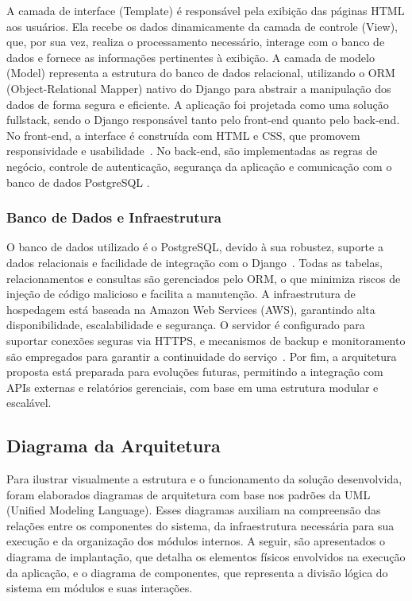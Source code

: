 \documentclass[
	12pt,				%
	openany,			%
	oneside,			%
	a4paper,			%
	english,			%
	french,				%
	spanish,			%
	brazil				%
	]{abntex2}
\begin{document}
A camada de interface (Template) é responsável pela exibição das páginas HTML aos usuários. Ela recebe os dados dinamicamente da camada de controle (View), que, por sua vez, realiza o processamento necessário, interage com o banco de dados e fornece as informações pertinentes à exibição. A camada de modelo (Model) representa a estrutura do banco de dados relacional, utilizando o ORM (Object-Relational Mapper) nativo do Django para abstrair a manipulação dos dados de forma segura e eficiente.
A aplicação foi projetada como uma solução fullstack, sendo o Django responsável tanto pelo front-end quanto pelo back-end. No front-end, a interface é construída com HTML e CSS, que promovem responsividade e usabilidade~\cite{duckett}. No back-end, são implementadas as regras de negócio, controle de autenticação, segurança da aplicação e comunicação com o banco de dados PostgreSQL
.
\subsubsection{Banco de Dados e Infraestrutura}

O banco de dados utilizado é o PostgreSQL, devido à sua robustez, suporte a dados relacionais e facilidade de integração com o Django~\cite{postgresql}. Todas as tabelas, relacionamentos e consultas são gerenciados pelo ORM, o que minimiza riscos de injeção de código malicioso e facilita a manutenção.
A infraestrutura de hospedagem está baseada na Amazon Web Services (AWS), garantindo alta disponibilidade, escalabilidade e segurança. O servidor é configurado para suportar conexões seguras via HTTPS, e mecanismos de backup e monitoramento são empregados para garantir a continuidade do serviço~\cite{aws-doc}.
Por fim, a arquitetura proposta está preparada para evoluções futuras, permitindo a integração com APIs externas e relatórios gerenciais, com base em uma estrutura modular e escalável.


\subsection{Diagrama da Arquitetura}
Para ilustrar visualmente a estrutura e o funcionamento da solução desenvolvida, foram elaborados diagramas de arquitetura com base nos padrões da UML (Unified Modeling Language). Esses diagramas auxiliam na compreensão das relações entre os componentes do sistema, da infraestrutura necessária para sua execução e da organização dos módulos internos.
A seguir, são apresentados o diagrama de implantação, que detalha os elementos físicos envolvidos na execução da aplicação, e o diagrama de componentes, que representa a divisão lógica do sistema em módulos e suas interações.
\end{document}
